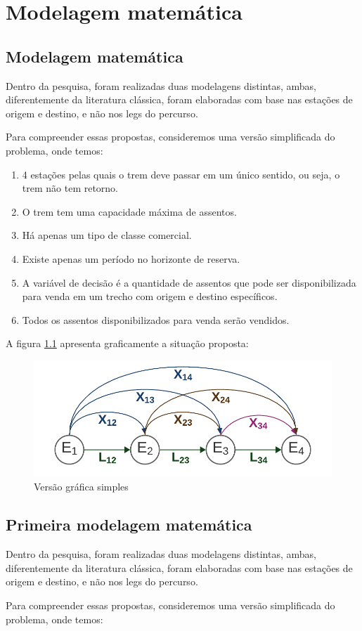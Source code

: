 \chapter{Modelagem matemática}

\section{Modelagem matemática}

Dentro da pesquisa, foram realizadas duas modelagens distintas, ambas, diferentemente da literatura clássica, foram elaboradas com base nas estações de origem e destino, e não nos legs do percurso.

Para compreender essas propostas, consideremos uma versão simplificada do problema, onde temos:

\begin{enumerate}[label=\textbullet]
	\item 4 estações pelas quais o trem deve passar em um único sentido, ou seja, o trem não tem retorno.
	\item O trem tem uma capacidade máxima de assentos.
	\item Há apenas um tipo de classe comercial.
	\item Existe apenas um período no horizonte de reserva.
	\item A variável de decisão é a quantidade de assentos que pode ser disponibilizada para venda em um trecho com origem e destino específicos.
	\item Todos os assentos disponibilizados para venda serão vendidos.
\end{enumerate}

A figura \ref{fig: fig1} apresenta graficamente a situação proposta:

\begin{figure}[th]
	\begin{center}
		\includegraphics[]{img/fig1.png}
		\caption{Versão gráfica simples}
		\label{fig: fig1}
	\end{center}
\end{figure}



\section{Primeira modelagem matemática}\label{sec:modelo1}
Dentro da pesquisa, foram realizadas duas modelagens distintas, ambas, diferentemente da literatura clássica, foram elaboradas com base nas estações de origem e destino, e não nos legs do percurso.

Para compreender essas propostas, consideremos uma versão simplificada do problema, onde temos:

